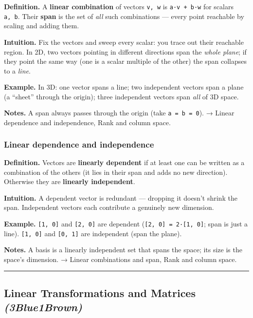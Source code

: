 \documentclass[
  10pt,
  letterpaper,
  onecolumn]{article}
\begin{document}
\textbf{Definition.} A \textbf{linear combination} of vectors
\texttt{v,\ w} is \texttt{a·v\ +\ b·w} for scalars \texttt{a,\ b}. Their
\textbf{span} is the set of \emph{all} such combinations --- every point
reachable by scaling and adding them.

\textbf{Intuition.} Fix the vectors and sweep every scalar: you trace
out their reachable region. In 2D, two vectors pointing in different
directions span the \emph{whole plane}; if they point the same way (one
is a scalar multiple of the other) the span collapses to a \emph{line}.

\textbf{Example.} In 3D: one vector spans a line; two independent
vectors span a plane (a ``sheet'' through the origin); three independent
vectors span \emph{all} of 3D space.

\textbf{Notes.} A span always passes through the origin (take
\texttt{a\ =\ b\ =\ 0}). → Linear dependence and independence, Rank and
column space.

\hypertarget{linear-dependence-and-independence}{%
\subsubsection{Linear dependence and
independence}\label{linear-dependence-and-independence}}

\textbf{Definition.} Vectors are \textbf{linearly dependent} if at least
one can be written as a combination of the others (it lies in their span
and adds no new direction). Otherwise they are \textbf{linearly
independent}.

\textbf{Intuition.} A dependent vector is redundant --- dropping it
doesn't shrink the span. Independent vectors each contribute a genuinely
new dimension.

\textbf{Example.} \texttt{{[}1,\ 0{]}} and \texttt{{[}2,\ 0{]}} are
dependent (\texttt{{[}2,\ 0{]}\ =\ 2·{[}1,\ 0{]}}; span is just a line).
\texttt{{[}1,\ 0{]}} and \texttt{{[}0,\ 1{]}} are independent (span the
plane).

\textbf{Notes.} A basis is a linearly independent set that spans the
space; its size is the space's dimension. → Linear combinations and
span, Rank and column space.

\begin{center}\rule{0.5\linewidth}{0.5pt}\end{center}

\hypertarget{linear-transformations-and-matrices-3blue1brown}{%
\subsection{\texorpdfstring{Linear Transformations and Matrices
\emph{(3Blue1Brown)}}{Linear Transformations and Matrices (3Blue1Brown)}}\label{linear-transformations-and-matrices-3blue1brown}}
\end{document}
